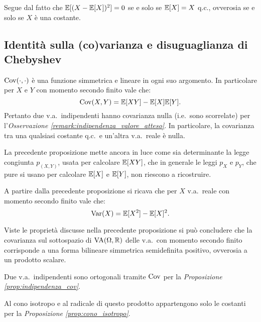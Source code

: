 \begin{multicols*}{2}
\begin{proposition}
    Segue dal fatto che $\mathbb{E}[(X -\mathbb{E}[X])^2] = 0$ se e solo se
    $\mathbb{E}[X] = X$ q.c., ovverosia se e solo se $X$ è una costante.
\end{proposition}

\subsection{Identità sulla (co)varianza e disuguaglianza di Chebyshev}

\begin{proposition}
    \label{prop:indipendenza_cov}
    $\operatorname{Cov}(\cdot, \cdot)$ è una funzione simmetrica e
    lineare in ogni suo argomento. In particolare per
    $X$ e $Y$ con momento secondo finito vale che:
    \[
        \operatorname{Cov}(X, Y) = \mathbb{E}[XY] - \mathbb{E}[X] \mathbb{E}[Y].
    \]
    Pertanto due v.a.~indipendenti hanno covarianza nulla (i.e.~sono scorrelate)
    per l'\textit{Osservazione \ref{remark:indipendenza_valore_atteso}}.
    In particolare, la covarianza tra una qualsiasi costante q.c.~e
    un'altra v.a.~reale è nulla.
\end{proposition}

\begin{remark}
    La precedente proposizione mette ancora in luce come sia determinante la
    legge congiunta $p_{(X, Y)}$, usata per calcolare $\mathbb{E}[XY]$, che
    in generale le leggi $p_X$ e $p_Y$, che pure si usano per calcolare
    $\mathbb{E}[X]$ e $\mathbb{E}[Y]$, non riescono a ricostruire.
\end{remark}

\begin{remark}
    A partire dalla precedente proposizione si ricava che per $X$ v.a.~reale
    con momento secondo finito vale che:
    \[
        \operatorname{Var}(X) = \mathbb{E}[X^2] - \mathbb{E}[X]^2.
    \]
\end{remark}

\begin{remark}
    Viste le proprietà discusse nella precedente proposizione
    si può concludere che la covarianza sul sottospazio di $\operatorname{VA}(\Omega, \mathbb{R})$
    delle v.a.~con momento secondo finito
    corrisponde a una forma bilineare simmetrica semidefinita positivo,
    ovverosia a un prodotto scalare. \smallskip


    Due v.a.~indipendenti sono ortogonali tramite $\operatorname{Cov}$ per la
    \textit{Proposizione \ref{prop:indipendenza_cov}}. \smallskip

    Al cono isotropo e al radicale di questo prodotto appartengono solo le costanti per la
    \textit{Proposizione \ref{prop:cono_isotropo}}. \smallskip



\end{remark}
\end{multicols*}
